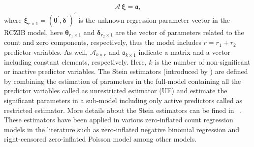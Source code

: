 \documentclass[twoside]{article}
\begin{document}
\begin{eqnarray}\label{e 1}
\boldsymbol{\mathcal{A}}\, \boldsymbol{\xi} = \boldsymbol{ \mathfrak{a} } ,
\end{eqnarray}
where
$ \boldsymbol{\xi}_{r \times 1} = ( \boldsymbol{\theta}^\prime , \boldsymbol{\delta}^\prime )^\prime $
is the unknown regression parameter vector in the RCZIB model, here
$ \boldsymbol{\theta}_{ r_1 \times 1 } $ 
and
$ \boldsymbol{\delta}_{ r_2 \times 1 } $ 
are the vector of parameters related to the count and zero components, respectively, thus the model includes 
$ r = r_1 + r_2 $
predictor variables. As well, 
$ \boldsymbol{\mathcal{A}}_{k \times r} $
and
$ \boldsymbol{ \mathfrak{a} }_{k \times 1} $
indicate a matrix and a vector including constant elements, respectively. Here, 
$ k $
is the number of non-significant or inactive predictor variables. The Stein estimators (introduced by \cite{Stein:1956}) are defined by combining the estimation of parameters in the full-model containing all the predictor variables called as unrestricted estimator (UE) and estimate the significant parameters in a sub-model including only active predictors called as restricted estimator. More details about the Stein estimators can be fined in \ \cite{Saleh:2006}. These estimators have been applied in various zero-inflated count regression models in the literature such as zero-inflated negative binomial regression \cite{Zandi:et:al:2021} and right-censored zero-inflated Poisson model \cite{Zandi:et:al:2024} among other models.
\end{document}
